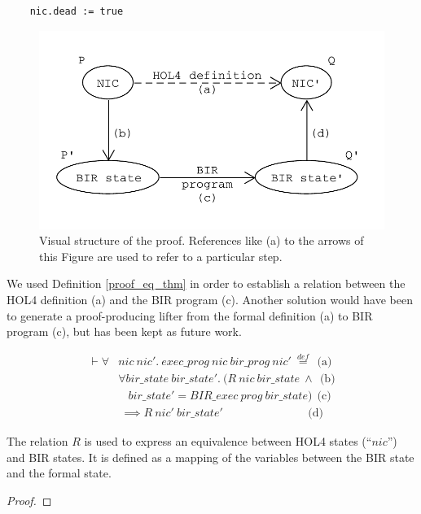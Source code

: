 \documentclass[10pt,a4paper]{article}
\newcommand{\eqdef}{\stackrel{def}{=}}
\begin{document}
\begin{multicols}{2}
\begin{lstlisting}
    nic.dead := true
\end{lstlisting}
%
\begin{figure}[H]
	\includegraphics[width=\columnwidth]{figures/proof_schema.pdf}
	\centering
	\caption{Visual structure of the proof. References like (a) to the arrows of this Figure are used to refer to a particular step.}
	\label{proof_schema}
\end{figure}
%
\par We used Definition \ref{proof_eq_thm} in order to establish a relation between the HOL4 definition (a) and the BIR program (c). Another solution would have been to generate a proof-producing lifter from the formal definition (a) to BIR program (c), but has been kept as future work.
%
\begin{small}
  \begin{equation}
  \begin{split}
    \vdash \forall &nic~nic'.~exec\_prog~nic~bir\_prog~nic'~\eqdef ~~ \text{(a)}\\
      &\forall bir\_state~bir\_state'.~(R~nic~bir\_state~\land ~~ \text{(b)}\\
            &~~~~bir\_state' = BIR\_exec~prog~bir\_state) ~~ \text{(c)}\\
            &~\implies R~nic'~bir\_state' ~~~~~~~~~~~~~~~~~~~~~~~~~~~~~~~~~\, \text{(d)}
  \end{split}
  \label{proof_eq_thm}
  \end{equation}
\end{small}
%
\par The relation $R$ is used to express an equivalence between HOL4 states (``$nic$'') and BIR states. It is defined as a mapping of the variables between the BIR state and the formal state.

\begin{proof}


\end{proof}
\end{multicols}
\end{document}
